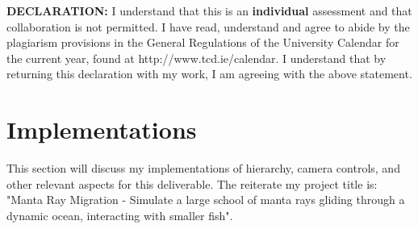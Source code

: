 \documentclass[a4paper, 10pt]{article}
\begin{document}

\begin{tcolorbox}[colback=light-blue]
\begin{small}
\textbf{DECLARATION:} I understand that this is an \textbf{individual} assessment and that collaboration is not permitted. I have read, understand and agree to abide by the plagiarism provisions in the
General Regulations of the University Calendar for the
current year, found at http://www.tcd.ie/calendar.
I understand that by returning this declaration with my work, I am agreeing with the above statement. 
\end{small}
\end{tcolorbox}

\bigskip







\section{Implementations}
This section will discuss my implementations of hierarchy, camera controls, and other relevant aspects for this deliverable.
The reiterate my project title is: 
"Manta Ray Migration - Simulate a large school of manta rays gliding through a dynamic ocean, interacting with smaller fish".
\end{document}

